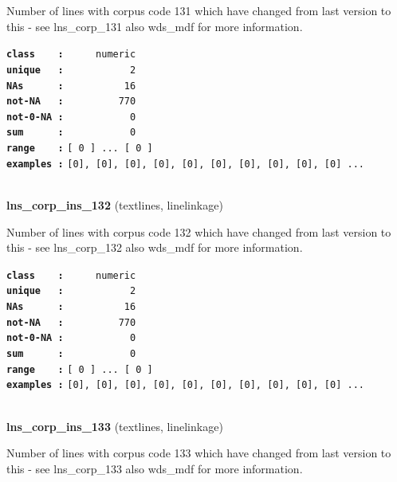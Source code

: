 \documentclass[]{article}
\begin{document}
Number of lines with corpus code 131 which have changed from last
version to this - see lns\_corp\_131 also wds\_mdf for more information.

\textbf{\texttt{class\ \ \ \ :}} \texttt{~~~~~numeric}\\
\textbf{\texttt{unique\ \ \ :}} \texttt{~~~~~~~~~~~2}\\
\textbf{\texttt{NAs\ \ \ \ \ \ :}} \texttt{~~~~~~~~~~16}\\
\textbf{\texttt{not-NA\ \ \ :}} \texttt{~~~~~~~~~770}\\
\textbf{\texttt{not-0-NA\ :}} \texttt{~~~~~~~~~~~0}\\
\textbf{\texttt{sum\ \ \ \ \ \ :}} \texttt{~~~~~~~~~~~0}\\
\textbf{\texttt{range\ \ \ \ :}}
\texttt{{[}\ 0\ {]}\ ...\ {[}\ 0\ {]}}\\
\textbf{\texttt{examples\ :}}
\texttt{{[}0{]},\ {[}0{]},\ {[}0{]},\ {[}0{]},\ {[}0{]},\ {[}0{]},\ {[}0{]},\ {[}0{]},\ {[}0{]},\ {[}0{]}\ ...}\\

~

\textbf{lns\_corp\_ins\_132} (textlines, linelinkage)

Number of lines with corpus code 132 which have changed from last
version to this - see lns\_corp\_132 also wds\_mdf for more information.

\textbf{\texttt{class\ \ \ \ :}} \texttt{~~~~~numeric}\\
\textbf{\texttt{unique\ \ \ :}} \texttt{~~~~~~~~~~~2}\\
\textbf{\texttt{NAs\ \ \ \ \ \ :}} \texttt{~~~~~~~~~~16}\\
\textbf{\texttt{not-NA\ \ \ :}} \texttt{~~~~~~~~~770}\\
\textbf{\texttt{not-0-NA\ :}} \texttt{~~~~~~~~~~~0}\\
\textbf{\texttt{sum\ \ \ \ \ \ :}} \texttt{~~~~~~~~~~~0}\\
\textbf{\texttt{range\ \ \ \ :}}
\texttt{{[}\ 0\ {]}\ ...\ {[}\ 0\ {]}}\\
\textbf{\texttt{examples\ :}}
\texttt{{[}0{]},\ {[}0{]},\ {[}0{]},\ {[}0{]},\ {[}0{]},\ {[}0{]},\ {[}0{]},\ {[}0{]},\ {[}0{]},\ {[}0{]}\ ...}\\

~

\textbf{lns\_corp\_ins\_133} (textlines, linelinkage)

Number of lines with corpus code 133 which have changed from last
version to this - see lns\_corp\_133 also wds\_mdf for more information.
\end{document}
